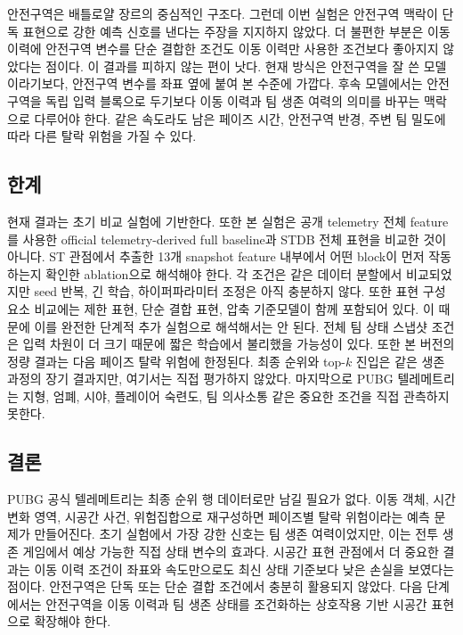 안전구역은 배틀로얄 장르의 중심적인 구조다. 그런데 이번 실험은 안전구역 맥락이
단독 표현으로 강한 예측 신호를 낸다는 주장을 지지하지 않았다. 더 불편한 부분은
이동 이력에 안전구역 변수를 단순 결합한 조건도 이동 이력만 사용한 조건보다 좋아지지
않았다는 점이다. 이 결과를 피하지 않는 편이 낫다. 현재 방식은 안전구역을 잘 쓴
모델이라기보다, 안전구역 변수를 좌표 옆에 붙여 본 수준에 가깝다. 후속 모델에서는
안전구역을 독립 입력 블록으로 두기보다 이동 이력과 팀 생존 여력의 의미를 바꾸는
맥락으로 다루어야 한다. 같은 속도라도 남은 페이즈 시간, 안전구역 반경, 주변 팀
밀도에 따라 다른 탈락 위험을 가질 수 있다.

\subsection{한계}

현재 결과는 초기 비교 실험에 기반한다. 또한 본 실험은 공개 telemetry 전체 feature를
사용한 official telemetry-derived full baseline과 STDB 전체 표현을 비교한 것이 아니다.
ST 관점에서 추출한 13개 snapshot feature 내부에서 어떤 block이 먼저 작동하는지
확인한 ablation으로 해석해야 한다. 각 조건은 같은 데이터 분할에서 비교되었지만
seed 반복, 긴 학습, 하이퍼파라미터 조정은 아직 충분하지 않다. 또한 표현 구성요소
비교에는 제한 표현, 단순 결합 표현, 압축 기준모델이 함께 포함되어 있다. 이 때문에
이를 완전한 단계적 추가 실험으로 해석해서는 안 된다. 전체 팀 상태 스냅샷 조건은
입력 차원이 더 크기 때문에 짧은 학습에서 불리했을 가능성이 있다. 또한 본 버전의
정량 결과는 다음 페이즈 탈락 위험에 한정된다. 최종 순위와
top-\(k\) 진입은 같은 생존 과정의 장기 결과지만, 여기서는 직접 평가하지 않았다.
마지막으로 PUBG 텔레메트리는 지형, 엄폐, 시야, 플레이어 숙련도, 팀 의사소통 같은
중요한 조건을 직접 관측하지 못한다.

\subsection{결론}

PUBG 공식 텔레메트리는 최종 순위 행 데이터로만 남길 필요가 없다. 이동 객체,
시간변화 영역, 시공간 사건, 위험집합으로 재구성하면 페이즈별 탈락
위험이라는 예측 문제가 만들어진다. 초기 실험에서 가장 강한 신호는 팀 생존 여력이었지만,
이는 전투 생존 게임에서 예상 가능한 직접 상태 변수의 효과다. 시공간 표현 관점에서
더 중요한 결과는 이동 이력 조건이 좌표와 속도만으로도 최신 상태 기준보다 낮은
손실을 보였다는 점이다. 안전구역은 단독 또는 단순 결합 조건에서 충분히 활용되지
않았다. 다음 단계에서는 안전구역을 이동 이력과 팀 생존 상태를 조건화하는 상호작용
기반 시공간 표현으로 확장해야 한다.
